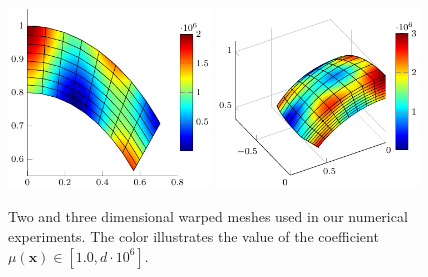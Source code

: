 \documentclass[smallcondensed,final]{svjour3}     %
\newcommand{\bs}[1]{\ensuremath{\boldsymbol #1}}
\begin{document}
\begin{figure}
	\includegraphics[width=0.48\textwidth]{figs/fan2d}
	\includegraphics[width=0.48\textwidth]{figs/fan3d}
	\caption{\label{fig:mesh} Two and three dimensional warped
          meshes used in our numerical experiments. The color
          illustrates the value of the coefficient $\mu(\bs x)\in [1.0,
            d\cdot 10^6]$.}
\end{figure}
\end{document}
